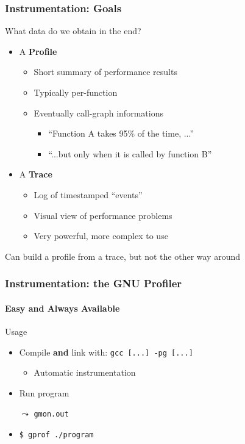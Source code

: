 \documentclass[xcolor={x11names,svgnames}]{beamer}
\begin{document}

\begin{frame}
  \frametitle{Instrumentation: Goals}

  \begin{block}{What data do we obtain in the end?}
    \begin{itemize}
    \item A \textbf{Profile}
      \begin{itemize}
      \item Short summary of performance results
      \item Typically per-function
      \item Eventually call-graph informations
        \begin{itemize}
        \item ``Function A takes 95\% of the time, ...''
        \item ``...but only when it is called by function B''
        \end{itemize}
      \end{itemize}
      
    \item A \textbf{Trace}
      \begin{itemize}
      \item Log of timestamped ``events''
      \item Visual view of performance problems
      \item Very powerful, more complex to use
      \end{itemize}
    \end{itemize}
  \end{block}

  Can build a profile from a trace, but not the other way around
\end{frame}


\begin{frame}
  \frametitle{Instrumentation: the GNU Profiler}
  \framesubtitle{Easy and Always Available}

  \begin{block}{Usage}
    \begin{itemize}
    \item Compile \textbf{and} link with: \texttt{gcc [...] -pg [...]}
      \begin{itemize}
      \item Automatic instrumentation
      \end{itemize}
    \item Run program
    \item[$\leadsto$] \texttt{gmon.out}
    \item \texttt{\$ gprof ./program}
    \end{itemize}
\end{block}
\end{frame}
\end{document}
